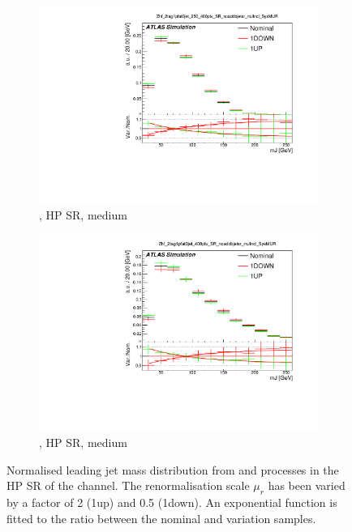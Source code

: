 \begin{figure}[!htbp]
\begin{subfigure}{.5\textwidth}
    \includegraphics[width=\textwidth]{chapters/6.vhbb_boosted/figs/0L_Zhf_2tag1pfat0jet_250_400ptv_SR_noaddbjetsr_mJIncl_SysMUR.pdf}
    \caption{\Zhf, HP SR, medium \pTV}
    \label{fig:Vjets_SysMUR_sub3}
  \end{subfigure}%
  \hfill
  \begin{subfigure}{.5\textwidth}
    \includegraphics[width=\textwidth]{chapters/6.vhbb_boosted/figs/0L_Zhf_2tag1pfat0jet_400ptv_SR_noaddbjetsr_mJIncl_SysMUR.pdf}
    \caption{\Zhf, HP SR, medium  \pTV}
    \label{fig:Vjets_SysMUR_sub4}
  \end{subfigure}%
  \hfill
  \caption{Normalised leading \largeR jet mass distribution from \Zboson and \Whf processes in the HP SR of the \zlep channel. The renormalisation scale $\mu_r$ has been varied by a factor of 2 (1up) and 0.5 (1down). An exponential function is fitted to the ratio between the nominal and variation samples.}
  \label{fig:Vjets_SysMUR}
\end{figure}

